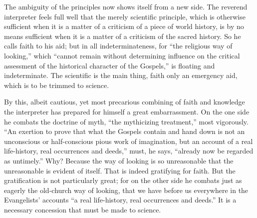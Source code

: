\documentclass[12pt,a4paper,openany]{book}
\newcommand{\opage}[1]{\marginnote{\footnotesize\textit{[#1]}}}
\begin{document}
The ambiguity of the principles now shows itself from a
new side. The reverend interpreter feels full well that
the merely scientific principle, which is otherwise sufficient
when it is a matter of a criticism of a piece of world history,
is by no means sufficient when it is a matter of
a criticism of the sacred history. So he calls
faith to his aid; but in all indeterminateness, for ``the religious
way of looking,'' which ``cannot remain without
determining influence on the critical assessment of
the historical character of the Gospels,'' is floating and indeterminate.
The scientific is the main thing, faith only
an emergency aid, which is to be trimmed to science.

By this, albeit cautious, yet most precarious
combining of faith and knowledge the interpreter has prepared
for himself a great embarrassment. On the one side
he combats the doctrine of myth, ``the mythicizing treatment,''
most vigorously. ``An exertion to
prove that what the Gospels contain and hand down
is not an unconscious or half-conscious pious work of imagination,
but an account of a real life-history,
real occurrences and deeds,'' must, he says,
``already now be regarded as untimely.'' Why? Because the way of looking
is so unreasonable that the unreasonable is evident of
itself. That is indeed gratifying for faith. But the gratification
is not particularly great; for on the other side he combats
just as eagerly the old-church way of looking,
\setcounter{footnote}{0}%
\opage{321}that we have before us everywhere in the Evangelists' accounts ``a
real life-history, real occurrences and deeds.'' It is a necessary concession that
must be made to science.
\end{document}
